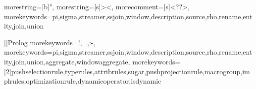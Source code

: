 \usepackage{listings}



{
  morestring=[b]",
  morestring=[s]{>}{<},
  morecomment=[s]{<?}{?>},
  morekeywords={pi,sigma,streamer,ssjoin,window,description,source,rho,rename,entity,join,union}%
}

[]{Prolog}{
   morekeywords={!,\_,:-},
   morekeywords={pi,sigma,streamer,ssjoin,window,description,source,rho,rename,entity,join,union,aggregate,windowaggregate},%
   morekeywords=[2]{pushselectionrule,typerules,attribrules,sugar,pushprojectionrule,macrogroup,implrules,optimizationrule,dynamicoperator,isdynamic}
}
